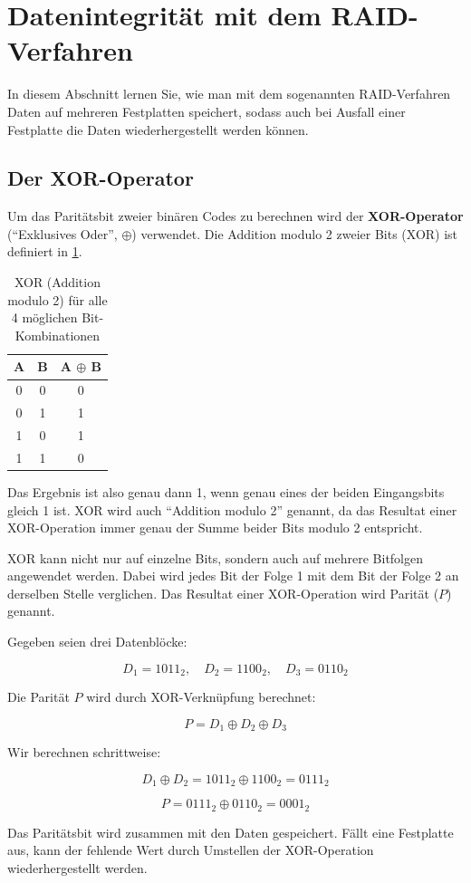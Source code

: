 \clearpage
\section{Datenintegrität mit dem RAID-Verfahren}

In diesem Abschnitt lernen Sie, wie man mit dem sogenannten RAID-Verfahren Daten auf mehreren Festplatten speichert, sodass auch bei Ausfall einer Festplatte die Daten wiederhergestellt werden können.

\subsection{Der XOR-Operator}

Um das Paritätsbit zweier binären Codes zu berechnen wird der \textbf{XOR-Operator} (\enquote{Exklusives Oder}, \(\oplus\)) verwendet. Die Addition modulo 2 zweier Bits (XOR) ist definiert in \cref{tab:mod2}.

\begin{table}[H]
	\centering
	\begin{tabular}{c|c||c}
		A & B & A \(\oplus\) B \\\midrule\midrule
		0 & 0 & 0              \\\midrule
		0 & 1 & 1              \\\midrule
		1 & 0 & 1              \\\midrule
		1 & 1 & 0              \\
	\end{tabular}
	\caption{XOR (Addition modulo 2) für alle 4 möglichen Bit-Kombinationen}
	\label{tab:mod2}
\end{table}

Das Ergebnis ist also genau dann 1, wenn genau eines der beiden Eingangsbits gleich 1 ist. XOR wird auch \enquote{Addition modulo 2} genannt, da das Resultat einer XOR-Operation immer genau der Summe beider Bits modulo 2 entspricht.

XOR kann nicht nur auf einzelne Bits, sondern auch auf mehrere Bitfolgen angewendet werden. Dabei wird jedes Bit der Folge 1 mit dem Bit der Folge 2 an derselben Stelle verglichen. Das Resultat einer XOR-Operation wird Parität (\(P\)) genannt.


\begin{myexample}
	Gegeben seien drei Datenblöcke:

	\[
		D_1 = 1011_2, \quad D_2 = 1100_2, \quad D_3 = 0110_2
	\]

	Die Parität \( P \) wird durch XOR-Verknüpfung berechnet:

	\[
		P = D_1 \oplus D_2 \oplus D_3
	\]

	Wir berechnen schrittweise:

	\[
		D_1 \oplus D_2 = 1011_2 \oplus 1100_2 = 0111_2
	\]

	\[
		P = 0111_2 \oplus 0110_2 = 0001_2
	\]

	Das Paritätsbit wird zusammen mit den Daten gespeichert. Fällt eine Festplatte aus, kann der fehlende Wert durch Umstellen der XOR-Operation wiederhergestellt werden.
\end{myexample}


